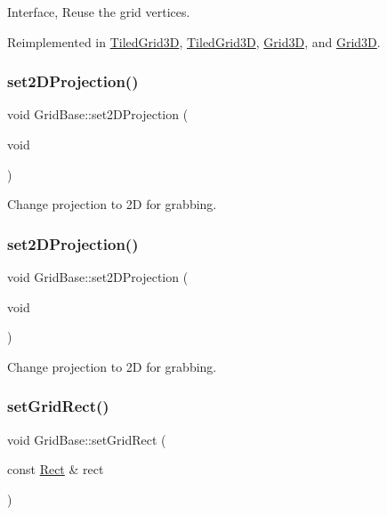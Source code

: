 Interface, Reuse the grid vertices. 

Reimplemented in \hyperlink{classTiledGrid3D_a5c415f064b5c2364ff8e27f33784db08}{Tiled\+Grid3D}, \hyperlink{classTiledGrid3D_a5eb814b2be0d828068c1a3ae68744049}{Tiled\+Grid3D}, \hyperlink{classGrid3D_a0a191279a3bb479d5d85a58c78685865}{Grid3D}, and \hyperlink{classGrid3D_ad6c4e2574b5a4104b7bde30bc083ffb7}{Grid3D}.

\mbox{\label{classGridBase_a424e6c77877c5146b05b10cb1d1c6b00}} 
\subsubsection{\texorpdfstring{set2\+D\+Projection()}{set2DProjection()}\hspace{0.1cm}{\footnotesize\ttfamily [1/2]}}
{\footnotesize\ttfamily void Grid\+Base\+::set2\+D\+Projection (\begin{DoxyParamCaption}\item[{void}]{ }\end{DoxyParamCaption})}

Change projection to 2D for grabbing. \mbox{\label{classGridBase_a424e6c77877c5146b05b10cb1d1c6b00}} 
\subsubsection{\texorpdfstring{set2\+D\+Projection()}{set2DProjection()}\hspace{0.1cm}{\footnotesize\ttfamily [2/2]}}
{\footnotesize\ttfamily void Grid\+Base\+::set2\+D\+Projection (\begin{DoxyParamCaption}\item[{void}]{ }\end{DoxyParamCaption})}

Change projection to 2D for grabbing. \mbox{\label{classGridBase_a078da34e2b566d89e4364ab19a37311d}} 
\subsubsection{\texorpdfstring{set\+Grid\+Rect()}{setGridRect()}\hspace{0.1cm}{\footnotesize\ttfamily [1/2]}}
{\footnotesize\ttfamily void Grid\+Base\+::set\+Grid\+Rect (\begin{DoxyParamCaption}\item[{const \hyperlink{classRect}{Rect} \&}]{rect }\end{DoxyParamCaption})}



